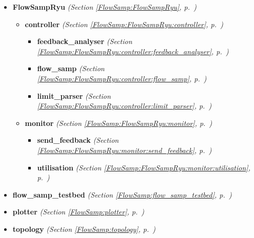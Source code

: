 \begin{itemize}
\setlength{\parskip}{0ex}
\item \textbf{FlowSampRyu}
  \textit{(Section \ref{FlowSamp:FlowSampRyu}, p.~\pageref{FlowSamp:FlowSampRyu})}

  \begin{itemize}
\setlength{\parskip}{0ex}
    \item \textbf{controller}
  \textit{(Section \ref{FlowSamp:FlowSampRyu:controller}, p.~\pageref{FlowSamp:FlowSampRyu:controller})}

      \begin{itemize}
    \setlength{\parskip}{0ex}
        \item \textbf{feedback\_analyser}
  \textit{(Section \ref{FlowSamp:FlowSampRyu:controller:feedback_analyser}, p.~\pageref{FlowSamp:FlowSampRyu:controller:feedback_analyser})}

        \item \textbf{flow\_samp}
  \textit{(Section \ref{FlowSamp:FlowSampRyu:controller:flow_samp}, p.~\pageref{FlowSamp:FlowSampRyu:controller:flow_samp})}

        \item \textbf{limit\_parser}
  \textit{(Section \ref{FlowSamp:FlowSampRyu:controller:limit_parser}, p.~\pageref{FlowSamp:FlowSampRyu:controller:limit_parser})}

      \end{itemize}
    \item \textbf{monitor}
  \textit{(Section \ref{FlowSamp:FlowSampRyu:monitor}, p.~\pageref{FlowSamp:FlowSampRyu:monitor})}

      \begin{itemize}
    \setlength{\parskip}{0ex}
        \item \textbf{send\_feedback}
  \textit{(Section \ref{FlowSamp:FlowSampRyu:monitor:send_feedback}, p.~\pageref{FlowSamp:FlowSampRyu:monitor:send_feedback})}

        \item \textbf{utilisation}
  \textit{(Section \ref{FlowSamp:FlowSampRyu:monitor:utilisation}, p.~\pageref{FlowSamp:FlowSampRyu:monitor:utilisation})}

      \end{itemize}
  \end{itemize}
\item \textbf{flow\_samp\_testbed}
  \textit{(Section \ref{FlowSamp:flow_samp_testbed}, p.~\pageref{FlowSamp:flow_samp_testbed})}

\item \textbf{plotter}
  \textit{(Section \ref{FlowSamp:plotter}, p.~\pageref{FlowSamp:plotter})}

\item \textbf{topology}
  \textit{(Section \ref{FlowSamp:topology}, p.~\pageref{FlowSamp:topology})}

\end{itemize}



